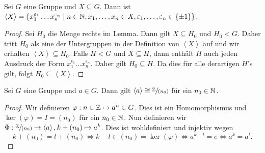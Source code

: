 \begin{lemma}
	Sei $G$ eine Gruppe und $X \subseteq G$. Dann ist $\left< X \right> = 
	\{x_{1}^{\varepsilon_1}\ldots x_{n}^{\varepsilon_{n}} \mid n \in \mathbb{N}, x_1,\ldots,x_{n} \in X, \varepsilon_1,\ldots,\varepsilon_{n} \in \{\pm 1\} \} $.
\end{lemma}

\begin{proof}
	Sei $H_0$ die Menge rechts im Lemma. Dann gilt $X \subseteq H_0$ und $H_0 < G$.
	Daher tritt $H_0$ als eine der Untergruppen in der Definition von $\left< X \right>$ auf und wir erhalten $\left< X \right> \subseteq H_0$.
	Falls $H < G$ und $X \subseteq H$, dann enthält $H$ auch jeden Ausdruck der Form $x_1^{\epsilon_1} \ldots x_{n}^{\epsilon_{n}}$.
	Daher gilt $H_0 \subseteq H$. Da dies für alle derartigen $H$'s gilt, folgt $H_0 \subseteq \left< X \right>$.
\end{proof}

\begin{lemma}
	Sei $G$ eine Gruppe und $a \in G$. Dann gilt $\left< a \right> \cong \sfrac{\mathbb{Z}}{(n_0)}$ für ein $n_0 \in \mathbb{N}$.
\end{lemma}

\begin{proof}
	Wir definieren $\varphi: n \in \mathbb{Z} \mapsto a^{n} \in G$. Dies ist ein Homomorphismus und $\ker(\varphi) = I = (n_0)$ für ein $n_0 \in \mathbb{N}$.
	Nun definieren wir $\Phi: \sfrac{\mathbb{Z}}{(n_0)} \to  \left< a \right>, k+(n_0) \mapsto a^{k}$.
	Dies ist wohldefiniert und injektiv wegen
	\[
		k+(n_0) = l+(n_0) \Leftrightarrow k-l \in (n_0) = \ker(\varphi) \Leftrightarrow a^{k-l} = e \Leftrightarrow a^{k} = a^{l}
	.\] 
\end{proof}

